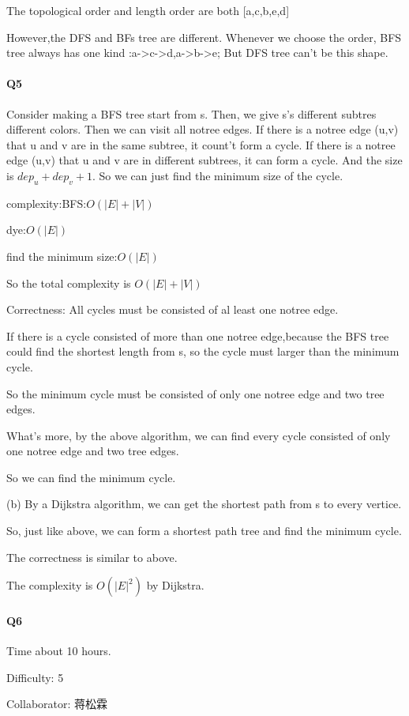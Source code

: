\documentclass[UTF8]{ctexart}
\renewcommand{\(}{\left(}
\renewcommand{\)}{\right)}
\begin{document}
The topological order and length order are both [a,c,b,e,d]

However,the DFS and BFs tree are different.
Whenever we choose the order, BFS tree always has one kind :a->c->d,a->b->e;
But DFS tree can't be this shape.

\paragraph{Q5}
Consider making a BFS tree start from s.
Then, we give s's different subtres different colors. 
Then we can visit all notree edges.
If there is a notree edge (u,v) that u and v are in the same subtree, it count't form a cycle.
If there is a notree edge (u,v) that u and v are in different subtrees, it can form a cycle. And the size is $dep_u+dep_v+1$.
So we can just find the minimum size of the cycle.

complexity:BFS:$O(\left|E\right|+\left|V\right|)$

dye:$O(\left|E\right|)$

find the minimum size:$O(\left|E\right|)$

So the total complexity is $O(\left|E\right|+\left|V\right|)$

Correctness: All cycles must be consisted of al least one notree edge.

If there is a cycle consisted of more than one notree edge,because the BFS tree could find the shortest length
from s, so the cycle must larger than the minimum cycle.

So the minimum cycle must be consisted of only one notree edge and two tree edges.

What's more, by the above algorithm, we can find every cycle consisted of only one notree edge and two tree edges.

So we can find the minimum cycle.

(b) By a Dijkstra algorithm, we can get the shortest path from s to every vertice. 

So, just like above, we can form a shortest path tree and find the minimum cycle.

The correctness is similar to above.

The complexity is $O(\left|E\right|^{2})$ by Dijkstra.

\paragraph{Q6}

Time about 10 hours.

Difficulty: 5

Collaborator: 蒋松霖
\end{document}
